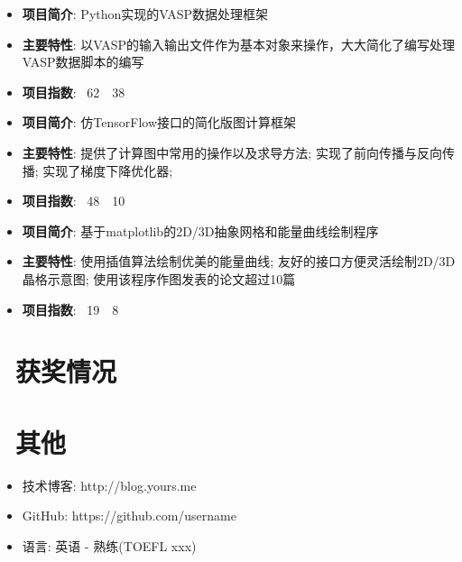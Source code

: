 \documentclass{resume}
\begin{document}
\begin{onehalfspacing}
\begin{itemize}
    \item \textbf{项目简介}: Python实现的VASP数据处理框架
    \item \textbf{主要特性}: 以VASP的输入输出文件作为基本对象来操作，大大简化了编写处理VASP数据脚本的编写
    \item \textbf{项目指数}: \faStar\ 62\, \faCodeFork\ 38
\end{itemize}
\end{onehalfspacing}

\begin{onehalfspacing}
\begin{itemize}
    \item \textbf{项目简介}: 仿TensorFlow接口的简化版图计算框架
    \item \textbf{主要特性}: 提供了计算图中常用的操作以及求导方法; 实现了前向传播与反向传播; 实现了梯度下降优化器;
    \item \textbf{项目指数}: \faStar\ 48\, \faCodeFork\ 10
\end{itemize}
\end{onehalfspacing}

\begin{onehalfspacing}
\begin{itemize}
    \item \textbf{项目简介}: 基于matplotlib的2D/3D抽象网格和能量曲线绘制程序
    \item \textbf{主要特性}: 使用插值算法绘制优美的能量曲线; 友好的接口方便灵活绘制2D/3D晶格示意图; 使用该程序作图发表的论文超过10篇
    \item \textbf{项目指数}: \faStar\ 19\, \faCodeFork\ 8
\end{itemize}
\end{onehalfspacing}

\section{\faHeartO\ 获奖情况}

\section{\faInfo\ 其他}
\begin{itemize}[parsep=0.5ex]
  \item 技术博客: http://blog.yours.me
  \item GitHub: https://github.com/username
  \item 语言: 英语 - 熟练(TOEFL xxx)
\end{itemize}
\end{document}
